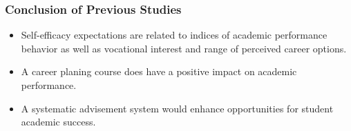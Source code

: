 \begin{frame}
    \frametitle{Conclusion of Previous Studies}
    \Large
    \begin{itemize}[<+->]
        \item Self-efficacy expectations are related to indices of academic performance behavior as well as vocational interest and range of perceived career options.\cite{lent1986self}
        \item A career planing course does have a positive impact on academic performance.\cite{folsom2005impact}
        \item A systematic advisement system would enhance opportunities for student academic success.\cite{jones1983impact}
    \end{itemize}
\end{frame}